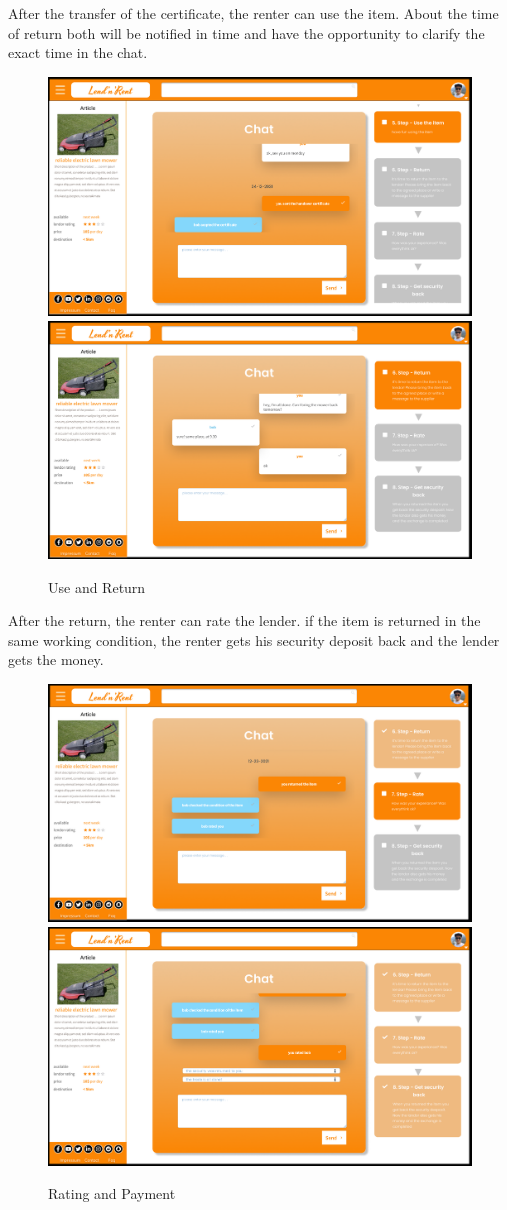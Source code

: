 \newpage
\noindent
After the transfer of the certificate, the renter can use the item. About the time of return both will be notified in time and have the opportunity to clarify the exact time in the chat.

\begin{figure}[H]
	\centering
	\includegraphics[width=0.49\linewidth]{abb/17step5}
	\includegraphics[width=0.49\linewidth]{abb/18step6}
	\caption{Use and Return}
	\label{fig:Negotiation4}
	\centering
\end{figure}

\noindent
After the return, the renter can rate the lender. if the item is returned in the same working condition, the renter gets his security deposit back and the lender gets the money.

\begin{figure}[H]
	\centering
	\includegraphics[width=0.49\linewidth]{abb/19step7}
	\includegraphics[width=0.49\linewidth]{abb/20steplast}
	\caption{Rating and Payment}
	\label{fig:Negotiation5}
	\centering
\end{figure}

